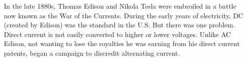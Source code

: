 \documentclass[preview]{standalone}
\begin{document}
\centering \boldsymbol{\cdot} In the late 1880s, Thomas Edison and Nikola Tesla were embroiled in a battle now known as the War of the Currents. \boldsymbol{\cdot} During the early years of electricity, DC (created by Edison) was the standard in the U.S. \boldsymbol{\cdot} But there was one problem. Direct current is not easily converted to higher or lower voltages. Unlike AC \boldsymbol{\cdot} Edison, not wanting to lose the royalties he was earning from his direct current patents, began a campaign to discredit alternating current.
\end{document}
